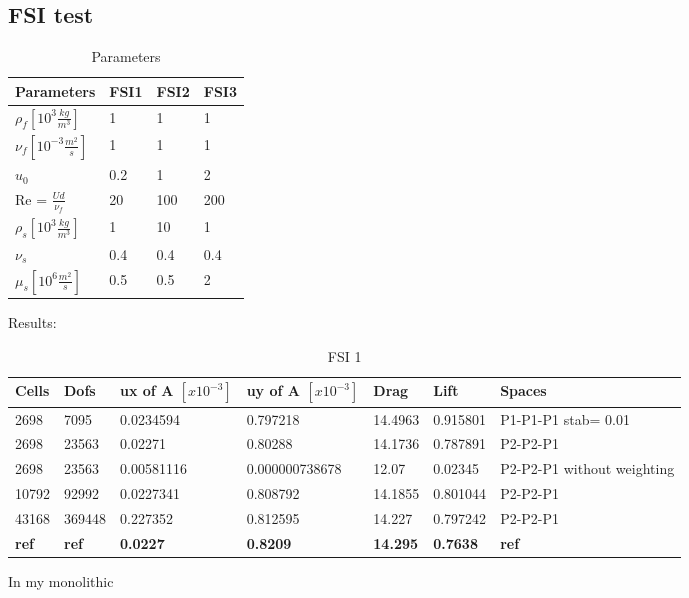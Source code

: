\newpage 

\subsection*{FSI test}
\begin{table}[ht]
\centering
\caption{Parameters}
\label{my-label}
\begin{tabular}{|l|l|l|l|}
\hline
Parameters & FSI1 & FSI2 & FSI3 \\ \hline
$\rho_f[10^3 \frac{kg}{m^3}]$ & 1 & 1 & 1 \\ \hline
$\nu_f [10^{-3} \frac{m^2}{s}]$ & 1 & 1 & 1 \\ \hline
$u_0$ & 0.2 & 1 & 2 \\ \hline
Re = $\frac{U d}{\nu_f}$ & 20 & 100 & 200 \\ \hline
$\rho_s[10^3 \frac{kg}{m^3}]$ & 1 & 10 & 1 \\ \hline
$\nu_s$ & 0.4 & 0.4 & 0.4 \\ \hline
$\mu_s[10^6 \frac{m^2}{s}]$ & 0.5 & 0.5 & 2 \\ \hline
\end{tabular}
\end{table}
Results: 
\begin{table}[h]
\centering
\caption{FSI 1}
\label{my-label}
\begin{tabular}{|l|l|l|l|l|l|l|}
\hline
Cells & Dofs & ux of A $[x10^{-3}]$ & uy of A $[x10^{-3}]$ & Drag & Lift & Spaces \\ \hline
2698 & 7095 & 0.0234594 & 0.797218  & 14.4963 & 0.915801 & P1-P1-P1 stab= 0.01 \\ \hline
2698 & 23563 & 0.02271 & 0.80288 & 14.1736 & 0.787891 & P2-P2-P1 \\ \hline
2698 & 23563 & 0.00581116 & 0.000000738678  & 12.07 & 0.02345 & P2-P2-P1 without weighting \\ \hline
10792 & 92992 & 0.0227341 & 0.808792 & 14.1855 & 0.801044 & P2-P2-P1 \\ \hline
43168 & 369448 & 0.227352 & 0.812595 & 14.227 & 0.797242 & P2-P2-P1 \\ \hline
\textbf{ref} & \textbf{ref} & \textbf{0.0227} & \textbf{0.8209} & \textbf{14.295} & \textbf{0.7638} & \textbf{ref} \\ \hline
\end{tabular}
\end{table}
In my monolithic 




